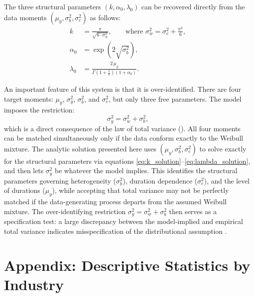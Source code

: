 \documentclass[12pt]{article}
\theoremstyle{definition}
\theoremstyle{remark}
\begin{document}
\begin{appendices}
The three structural parameters $(k, \alpha_0, \lambda_0)$ can be recovered directly from the data moments $(\mu_y, \sigma^2_{b}, \sigma^2_{e})$ as follows:
\begin{align}
    k &= \frac{\pi}{\sqrt{6 \cdot \sigma^2_{w}}}, \qquad \text{where } \sigma^2_{w} = \sigma^2_{e} + \frac{\pi^2}{6}, \label{eq:k_solution} \\[8pt]
    \alpha_0 &= \exp\!\left(2\sqrt{\sigma^2_{b}}\right), \label{eq:alpha_solution} \\[8pt]
    \lambda_0 &= \frac{2\,\mu_y}{\Gamma\!\left(1 + \frac{1}{k}\right)\left(1 + \alpha_0\right)}. \label{eq:lambda_solution}
\end{align}


An important feature of this system is that it is over-identified. There are four target moments: $\mu_y$, $\sigma^2_{y}$, $\sigma^2_{b}$, and $\sigma^2_{e}$, but only three free parameters. The model imposes the restriction:
\begin{equation}
    \sigma^2_{y} = \sigma^2_{w} + \sigma^2_{b},
\end{equation}
which is a direct consequence of the law of total variance (\cite{heckman1984method}). All four moments can be matched simultaneously only if the data conform exactly to the Weibull mixture. The analytic solution presented here uses $(\mu_y, \sigma^2_{b}, \sigma^2_{e})$ to solve exactly for the structural parameters via equations \eqref{eq:k_solution}--\eqref{eq:lambda_solution}, and then lets $\sigma^2_{y}$ be whatever the model implies. This identifies the structural parameters governing heterogeneity ($\sigma^2_{b}$), duration dependence ($\sigma^2_{e}$), and the level of durations ($\mu_y$), while accepting that total variance may not be perfectly matched if the data-generating process departs from the assumed Weibull mixture. The over-identifying restriction $\sigma^2_{y} = \sigma^2_{w} + \sigma^2_{b}$ then serves as a specification test: a large discrepancy between the model-implied and empirical total variance indicates misspecification of the distributional assumption \cite{van2001duration, abbring2007econometric}.

\clearpage

\section{Appendix: Descriptive Statistics by Industry}\label{AppendixIndustry}




\end{appendices}
\end{document}
